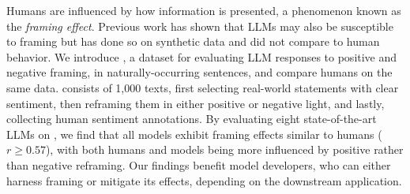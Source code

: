 


Humans are influenced by how information is presented, a phenomenon known as the \emph{framing effect}. Previous work has shown that LLMs may also be susceptible to framing but has done so on synthetic data and did not compare to human behavior.
We introduce \name{}, a dataset for evaluating LLM responses to positive and negative framing, in naturally-occurring sentences, and compare humans on the same data. \name{} consists of 1,000 texts, first selecting real-world statements with clear sentiment, then reframing them in either positive or negative light, and lastly, collecting human sentiment annotations. By evaluating eight state-of-the-art LLMs on \name{}, we find that all models exhibit framing effects similar to humans ($r\geq0.57$), with both humans and models being more influenced by positive rather than negative reframing. Our findings benefit model developers, who can either harness framing or mitigate its effects, depending on the downstream application.

